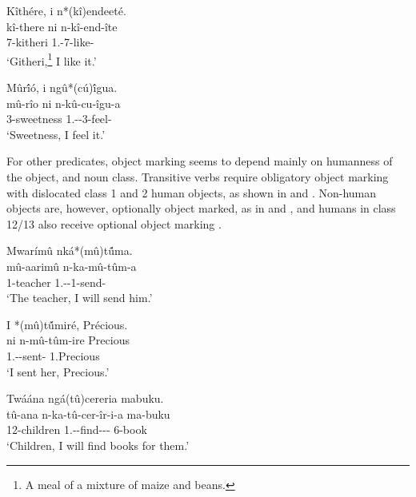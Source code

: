 \documentclass[output=paper]{langscibook}
\begin{document}
\ea
\label{bkm:Ref125199162}
Kîthére, i n*(kî)endeet\'{e}.\\
\gll
kî-there  ni  n-kî-end-îte\\
7-kitheri \FOC{}  1\SG.\SM{}-7\OM{}-like-\PFV{}\\
\glt
‘Githeri,\footnote{A meal of a mixture of maize and beans.} I like it.’

\z

\ea
\label{bkm:Ref125199180}
Mûr\'{î}ó, i ngû*(cú)\'{î}gua.\\
\gll
mû-rîo  ni    n-kû-cu-îgu-a\\
3-sweetness \FOC{}   1\SG.\SM-\PRS{}-3\OM{}-feel-\FV{}\\
\glt
‘Sweetness, I feel it.’

\z


For other predicates, object marking seems to depend mainly on humanness of the object, and noun class. Transitive verbs require obligatory object marking with dislocated class 1 and 2 human objects, as shown in  and . Non-human objects are, however, optionally object marked, as in  and , and humans in class 12/13 also receive optional object marking .\largerpage

\ea
\label{bkm:Ref125199202}
Mwarímû nká*(mû)t\'{û}ma.\\
\gll
mû-aarimû  n-ka-mû-tûm-a\\
1-teacher  1\SG.\SM{}-\FUT{}-1\OM{}-send-\FV{}\\
\glt
‘The teacher, I will send him.’

\z

\ea
\label{bkm:Ref125199217}
I *(mû)t\'{û}miré, Précious.\\
\gll
ni  n-mû-tûm-ire  Precious\\
\FOC{} 1\SG.\SM{}-\OM{}-sent-\PFV{} 1.Precious\\
\glt
‘I sent her, Precious.’

\z

\ea
\label{bkm:Ref116892950}
Twáána ngá(tû)cereria mabuku.\\
\gll
tû-ana  n-ka-tû-cer-îr-i-a  ma-buku\\
12-children 1\SG.\SM-\OM{}-find-\APPL-\IC-\FV{} 6-book\\
\glt
‘Children, I will find books for them.’
\end{document}
